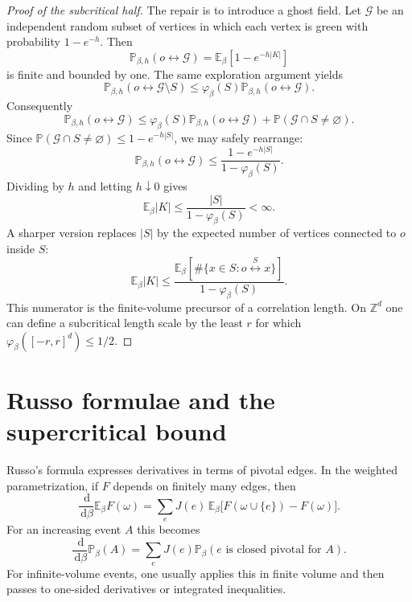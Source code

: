 \documentclass[11pt,reqno]{book}
\numberwithin{equation}{chapter}
\theoremstyle{plain}
\theoremstyle{definition}
\theoremstyle{remark}
\newcommand{\Pb}{\mathbb P_\beta}
\newcommand{\Eb}{\mathbb E_\beta}
\renewcommand{\P}{\mathbb P}
\newcommand{\Z}{\mathbb Z}
\newcommand{\1}{\mathbf 1}
\newcommand{\dd}{\,\mathrm d}
\begin{document}
\begin{proof}[Proof of the subcritical half]
The repair is to introduce a ghost field. Let $\mathcal G$ be an independent random subset of vertices in which each vertex is green with probability $1-e^{-h}$. Then
\[
  \P_{\beta,h}(o\leftrightarrow\mathcal G)
  =
  \Eb[1-e^{-h|K|}]
\]
is finite and bounded by one. The same exploration argument yields
\[
  \P_{\beta,h}(o\leftrightarrow \mathcal G\setminus S)
  \leq
  \varphi_\beta(S)\P_{\beta,h}(o\leftrightarrow\mathcal G).
\]
Consequently
\[
  \P_{\beta,h}(o\leftrightarrow\mathcal G)
  \leq
  \varphi_\beta(S)\P_{\beta,h}(o\leftrightarrow\mathcal G)
  +
  \P(\mathcal G\cap S\neq\varnothing).
\]
Since $\P(\mathcal G\cap S\neq\varnothing)\leq 1-e^{-h|S|}$, we may safely rearrange:
\[
  \P_{\beta,h}(o\leftrightarrow\mathcal G)
  \leq
  \frac{1-e^{-h|S|}}{1-\varphi_\beta(S)}.
\]
Dividing by $h$ and letting $h\downarrow0$ gives
\[
  \Eb |K|
  \leq
  \frac{|S|}{1-\varphi_\beta(S)}<\infty.
\]
A sharper version replaces $|S|$ by the expected number of vertices connected to $o$ inside $S$:
\[
  \Eb |K|
  \leq
  \frac{\Eb[\#\{x\in S:o\stackrel S\leftrightarrow x\}]}
  {1-\varphi_\beta(S)}.
\]
This numerator is the finite-volume precursor of a correlation length. On $\Z^d$ one can define a subcritical length scale by the least $r$ for which $\varphi_\beta([-r,r]^d)\leq 1/2$.
\end{proof}

\section{Russo formulae and the supercritical bound}

Russo's formula expresses derivatives in terms of pivotal edges. In the weighted parametrization, if $F$ depends on finitely many edges, then
\[
  \frac{\dd}{\dd\beta}\Eb F(\omega)
  =
  \sum_e J(e)\,
  \Eb\bigl[F(\omega\cup\{e\})-F(\omega)\bigr].
\]
For an increasing event $A$ this becomes
\[
  \frac{\dd}{\dd\beta}\Pb(A)
  =
  \sum_e J(e)\Pb(e\text{ is closed pivotal for }A).
\]
For infinite-volume events, one usually applies this in finite volume and then passes to one-sided derivatives or integrated inequalities.
\end{document}

